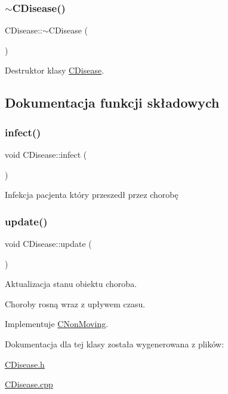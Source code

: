 \subsubsection{\texorpdfstring{$\sim$\+C\+Disease()}{~CDisease()}}
{\footnotesize\ttfamily C\+Disease\+::$\sim$\+C\+Disease (\begin{DoxyParamCaption}{ }\end{DoxyParamCaption})}



Destruktor klasy \mbox{\hyperlink{class_c_disease}{C\+Disease}}. 



\subsection{Dokumentacja funkcji składowych}
\mbox{\label{class_c_disease_ad0183fc219d8292b6e398a46ea700b2c}} 
\subsubsection{\texorpdfstring{infect()}{infect()}}
{\footnotesize\ttfamily void C\+Disease\+::infect (\begin{DoxyParamCaption}{ }\end{DoxyParamCaption})}



Infekcja pacjenta który przeszedł przez chorobę 

\mbox{\label{class_c_disease_a2f8e7ad1e743ace0540a09a6f620d6d7}} 
\subsubsection{\texorpdfstring{update()}{update()}}
{\footnotesize\ttfamily void C\+Disease\+::update (\begin{DoxyParamCaption}{ }\end{DoxyParamCaption})\hspace{0.3cm}{\ttfamily [virtual]}}



Aktualizacja stanu obiektu choroba. 

Choroby rosną wraz z upływem czasu. 

Implementuje \mbox{\hyperlink{class_c_non_moving_ad17a839c59eb2639623e863a3d6c8740}{C\+Non\+Moving}}.



Dokumentacja dla tej klasy została wygenerowana z plików\+:\begin{DoxyCompactItemize}
\item 
\mbox{\hyperlink{_c_disease_8h}{C\+Disease.\+h}}\item 
\mbox{\hyperlink{_c_disease_8cpp}{C\+Disease.\+cpp}}\end{DoxyCompactItemize}
